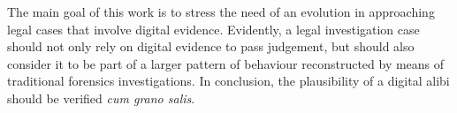 \documentclass[runningheads]{llncs}
\begin{document}
The main goal of this work is to stress the need of an evolution in approaching legal cases that involve digital evidence. 
Evidently, a legal investigation case should not only rely on digital evidence to pass judgement, but should also consider it to be part of a larger pattern of behaviour reconstructed by means of traditional forensics investigations. In conclusion, the plausibility of a digital alibi should be  
verified \emph{cum grano salis}.

%

%
%
%
%
%
%
\end{document}

